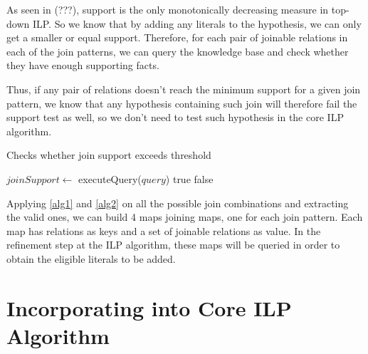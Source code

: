 As seen in (???), support is the only monotonically decreasing measure in top-down ILP. So we know that by adding any
literals to the hypothesis, we can only get a smaller or equal support. Therefore, for each pair of joinable relations
in each of the join patterns, we can query the knowledge base and check whether they have enough supporting facts.

Thus, if any pair of relations doesn't reach the minimum support for a given join pattern, we know that any hypothesis
containing such join will therefore fail the support test as well, so we don't need to test such hypothesis in the core
ILP algorithm.

\begin{algorithm}[!h]
  \caption{Checks whether join support exceeds threshold}
  \label{alg2}
     {
    }
    $joinSupport \leftarrow$ executeQuery($query$)\;
      {
      \Return true\;
    }{
      \Return false\;
    }
\end{algorithm}


Applying \ref{alg1} and \ref{alg2} on all the possible join combinations and extracting the valid ones, we can build 4
maps joining maps, one for each join pattern. Each map has relations as keys and a set of joinable relations as value.
In the refinement step at the ILP algorithm, these maps will be queried in order to obtain the eligible literals to be
added.

\subsection{}

\section{\graphname}
\label{ch:lattice}


\section{Incorporating \graphname into Core ILP Algorithm}
